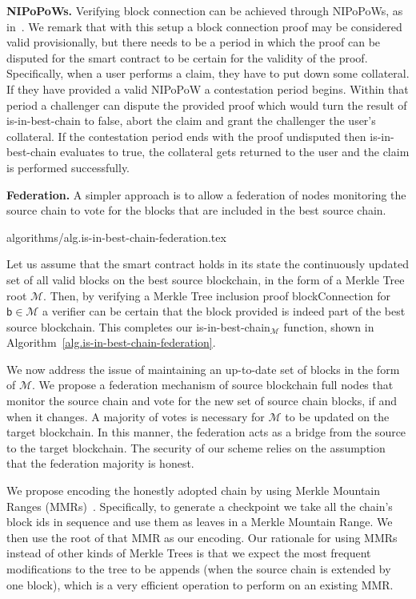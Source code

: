\noindent
\textbf{NIPoPoWs.}
Verifying block connection can be achieved through NIPoPoWs, as in~\cite{pow-sidechains}.
We remark that with this setup a block connection proof may be considered valid provisionally, but there needs to be a period in which the proof can be disputed for the smart contract to be certain for the validity of the proof. Specifically, when a user performs a claim, they have to put down some collateral. If they have provided a valid NIPoPoW a contestation period begins. Within that period a challenger can dispute the provided proof which would turn the result of \textsf{is-in-best-chain} to false, abort the claim and grant the challenger the user's collateral. If the contestation period ends with the proof undisputed then \textsf{is-in-best-chain} evaluates to true, the collateral gets returned to the user and the claim is performed successfully.

\noindent
\textbf{Federation.}
A simpler approach is to allow a federation of nodes monitoring the source chain to vote for the blocks that are included in the best source chain.

{algorithms/alg.is-in-best-chain-federation.tex}

Let us assume that the smart contract holds in its state the continuously updated set of all valid blocks on the best source blockchain, in the form of a Merkle Tree root $\mathcal{M}$. Then, by verifying a Merkle Tree inclusion proof \textsf{blockConnection} for $\textsf{b} \in \mathcal{M}$ a verifier can be certain that the block provided is indeed part of the best source blockchain. This completes our {\sf is-in-best-chain}$_\mathcal{M}$ function, shown in Algorithm~\ref{alg.is-in-best-chain-federation}.

We now address the issue of maintaining an up-to-date set of blocks in the form of $\mathcal{M}$. We propose a federation mechanism of source blockchain full nodes that monitor the source chain and vote for the new set of source chain blocks, if and when it changes. A majority of votes is necessary for $\mathcal{M}$ to be updated on the target blockchain. In this manner, the federation acts as a bridge from the source to the target blockchain. The security of our scheme relies on the assumption that the federation majority is honest.

We propose encoding the honestly adopted chain by using Merkle Mountain Ranges (MMRs)~\cite{flyclient}. Specifically, to generate a checkpoint we take all the chain's block ids in sequence and use them as leaves in a Merkle Mountain Range. We then use the root of that MMR as our encoding. Our rationale for using MMRs instead of other kinds of Merkle Trees is that we expect the most frequent modifications to the tree to be appends (when the source chain is extended by one block), which is a very efficient operation to perform on an existing MMR.
